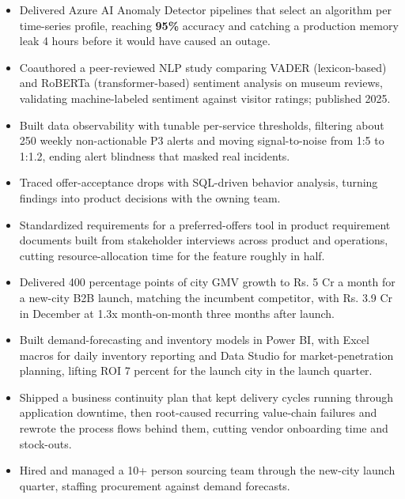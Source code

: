 \documentclass[letterpaper,10pt]{article}
\begin{document}
\begin{itemize}
\item Delivered Azure AI Anomaly Detector pipelines that select an algorithm per time-series profile, reaching \textbf{95\%} accuracy and catching a production memory leak 4 hours before it would have caused an outage.
\item Coauthored a peer-reviewed NLP study comparing VADER (lexicon-based) and RoBERTa (transformer-based) sentiment analysis on museum reviews, validating machine-labeled sentiment against visitor ratings; published 2025.
\item Built data observability with tunable per-service thresholds, filtering about 250 weekly non-actionable P3 alerts and moving signal-to-noise from 1:5 to 1:1.2, ending alert blindness that masked real incidents.
\end{itemize}

\begin{itemize}
\item Traced offer-acceptance drops with SQL-driven behavior analysis, turning findings into product decisions with the owning team.
\item Standardized requirements for a preferred-offers tool in product requirement documents built from stakeholder interviews across product and operations, cutting resource-allocation time for the feature roughly in half.
\end{itemize}

\begin{itemize}
\item Delivered 400 percentage points of city GMV growth to Rs. 5 Cr a month for a new-city B2B launch, matching the incumbent competitor, with Rs. 3.9 Cr in December at 1.3x month-on-month three months after launch.
\item Built demand-forecasting and inventory models in Power BI, with Excel macros for daily inventory reporting and Data Studio for market-penetration planning, lifting ROI 7 percent for the launch city in the launch quarter.
\item Shipped a business continuity plan that kept delivery cycles running through application downtime, then root-caused recurring value-chain failures and rewrote the process flows behind them, cutting vendor onboarding time and stock-outs.
\item Hired and managed a 10+ person sourcing team through the new-city launch quarter, staffing procurement against demand forecasts.
\end{itemize}
\end{document}
